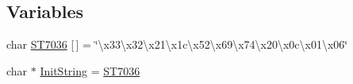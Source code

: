 \subsection*{Variables}
\begin{DoxyCompactItemize}
\item 
char \hyperlink{Uno__DS2408__LCD163_8ino_a4db2cbb1ca779c9719d1a0f4d7ba5669}{S\-T7036} \mbox{[}$\,$\mbox{]} = \char`\"{}\textbackslash{}x33\textbackslash{}x32\textbackslash{}x21\textbackslash{}x1c\textbackslash{}x52\textbackslash{}x69\textbackslash{}x74\textbackslash{}x20\textbackslash{}x0c\textbackslash{}x01\textbackslash{}x06\char`\"{}
\item 
char $\ast$ \hyperlink{Uno__DS2408__LCD163_8ino_a62481bf733fae27fbf5f83e4a3582c1c}{Init\-String} = \hyperlink{Uno__DS2408__LCD163_8ino_a4db2cbb1ca779c9719d1a0f4d7ba5669}{S\-T7036}
\end{DoxyCompactItemize}


